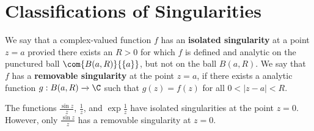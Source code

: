 \section{Classifications of Singularities}

\begin{definition}
    We say that a complex-valued function $f$ has an  \textbf{isolated
    singularity} at a point $z=a$ provied there exists an $R>0$ for which  $f$
    is defined and analytic on the punctured ball  $\com{B(a,R)}{\{a\}}$, but
    not on the ball $B(a,R)$. We say that $f$ has a  \textbf{removable
    singularity} at the point $z=a$, if there exists a analytic function
    $g:B(a,R) \xrightarrow{} \C$ such that $g(z)=f(z)$ for all $0<|z-a|<R$.
\end{definition}

\begin{example}\label{example_5.1}
    The functions $\frac{\sin{z}}{z}$, $\frac{1}{z}$, and $\exp{\frac{1}{z}}$
    have isolated singularities at the point $z=0$. However, only
    $\frac{\sin{z}}{z}$ has a removable singularity at $z=0$.
\end{example}


